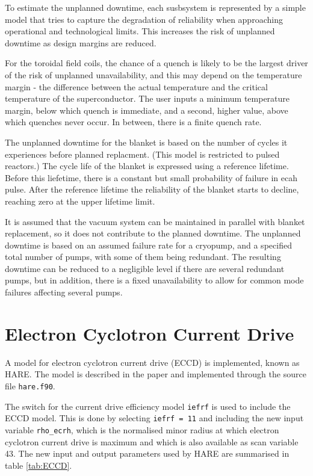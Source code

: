 \documentclass[11pt,a4paper]{report}
\begin{document}
To estimate the unplanned downtime, each susbsystem is represented by a simple model that tries to capture the degradation of reliability when approaching operational and technological limits.  This increases the risk of unplanned downtime as design margins are reduced.

For the toroidal field coils, the chance of a quench is likely to be the largest driver of the risk of unplanned unavailability, and this may depend on the temperature margin - the difference between the actual temperature and the critical temperature of the superconductor.  The user inputs a minimum temperature margin, below which quench is immediate, and a second, higher value, above which quenches never occur.  In between, there is a finite quench rate.

The unplanned downtime for the blanket is based on the number of cycles it experiences before planned replacment.  (This model is restricted to pulsed reactors.) The cycle life of the blanket is expressed using a reference lifetime.  Before this liefetime, there is a constant but small probability of failure in ecah pulse.  After the reference lifetime the reliability of the blanket starts to decline, reaching zero at the upper lifetime limit.

It is assumed that the vacuum system can be maintained in parallel with blanket replacement, so it does not contribute to the planned downtime.  The unplanned downtime is based on an assumed failure rate for a cryopump, and a specified total number of pumps, with some of them being redundant.  The resulting downtime can be reduced to a negligible level if there are several redundant pumps, but in addition, there is a fixed unavailability to allow for common mode failures affecting several pumps.

\section{Electron Cyclotron Current Drive}

A model for electron cyclotron current drive (ECCD) is implemented, known as HARE.  The model is described in the paper\cite{kovari_ECCD} and implemented through the source file \texttt{hare.f90}. 

The switch for the current drive efficiency model \texttt{iefrf} is used to include the ECCD model. This is done by selecting \texttt{iefrf = 11} and including the new input variable \texttt{rho\_ecrh},  which is the normalised minor radius at which electron cyclotron current drive is maximum and which is also available as scan variable 43. The new input and output parameters used by HARE are summarised in table \ref{tab:ECCD}.
\end{document}
